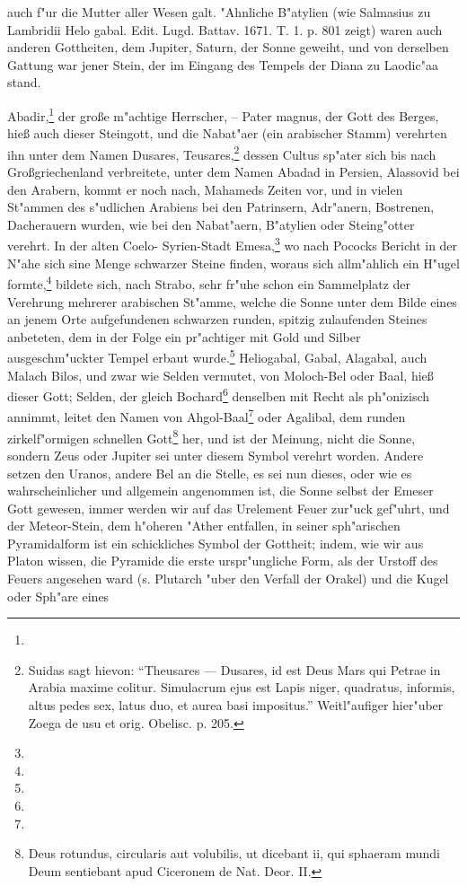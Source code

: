 \documentclass[a4paper, 11pt, oneside, polutonikogreek, german]{article}
\begin{document}
auch f"ur die Mutter aller Wesen galt. "Ahnliche B"atylien (wie Salmasius zu Lambridii Helo gabal. Edit. Lugd. Battav. 1671. T. 1. p. 801 zeigt) waren auch anderen Gottheiten, dem Jupiter, Saturn, der Sonne geweiht, und von derselben Gattung war jener Stein, der im Eingang des Tempels der Diana zu Laodic"aa stand.

Abadir,\footnote{} der große m"achtige Herrscher, -- Pater magnus, der Gott des Berges, hieß auch dieser Steingott, und die Nabat"aer (ein arabischer Stamm) verehrten ihn unter dem Namen Dusares, Teusares,\footnote{Suidas sagt hievon: "`Theusares --- Dusares, id est Deus Mars qui Petrae in Arabia maxime colitur. Simulacrum ejus est Lapis niger, quadratus, informis, altus pedes sex, latus duo, et aurea basi impositus."' Weitl"aufiger hier"uber Zoega de usu et orig. Obelisc. p. 205.} dessen Cultus sp"ater sich bis nach Großgriechenland verbreitete, unter dem Namen Abadad in Persien, Alassovid bei den Arabern, kommt er noch nach, Mahameds Zeiten vor, und in vielen St"ammen des s"udlichen Arabiens bei den Patrinsern, Adr"anern, Bostrenen, Dacherauern wurden, wie bei den Nabat"aern, B"atylien oder Steing"otter verehrt. In der alten Coelo- Syrien-Stadt Emesa,\footnote{} wo nach Pococks Bericht in der N"ahe sich sine Menge schwarzer Steine finden, woraus sich allm"ahlich ein H"ugel formte,\footnote{} bildete sich, nach Strabo, sehr fr"uhe schon ein Sammelplatz der Verehrung mehrerer arabischen St"amme, welche die Sonne unter dem Bilde eines an jenem Orte aufgefundenen schwarzen runden, spitzig zulaufenden Steines anbeteten, dem in der Folge ein pr"achtiger mit Gold und Silber ausgeschm"uckter Tempel erbaut wurde.\footnote{} Heliogabal, Gabal, Alagabal, auch Malach Bilos, und zwar wie Selden vermutet, von Moloch-Bel oder Baal, hieß dieser Gott; Selden, der gleich Bochard\footnote{} denselben mit Recht als ph"onizisch annimmt, leitet den Namen von Ahgol-Baal\footnote{} oder Agalibal, dem runden zirkelf"ormigen schnellen Gott\footnote{Deus rotundus, circularis aut volubilis, ut dicebant ii, qui sphaeram mundi Deum sentiebant apud Ciceronem de Nat. Deor. II.} her, und ist der Meinung, nicht die Sonne, sondern Zeus oder Jupiter sei unter diesem Symbol verehrt worden. Andere setzen den Uranos, andere Bel an die Stelle, es sei nun dieses, oder wie es wahrscheinlicher und allgemein angenommen ist, die Sonne selbst der Emeser Gott gewesen, immer werden wir auf das Urelement Feuer zur"uck gef"uhrt, und der Meteor-Stein, dem h"oheren "Ather entfallen, in seiner sph"arischen Pyramidalform ist ein schickliches Symbol der Gottheit; indem, wie wir aus Platon wissen, die Pyramide die erste urspr"ungliche Form, als der Urstoff des Feuers angesehen ward (s. Plutarch "uber den Verfall der Orakel) und die Kugel oder Sph"are eines 
\end{document}
